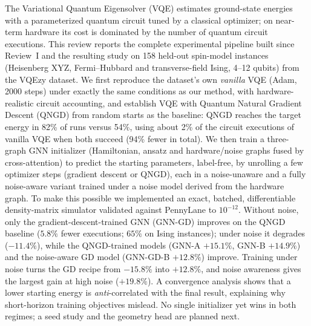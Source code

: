\documentclass{ssnreview}
\begin{document}
\makereviewtitle
\reviewfrontmatter

\begin{reviewabstract}
The Variational Quantum Eigensolver (VQE) estimates ground-state energies with a
parameterized quantum circuit tuned by a classical optimizer; on near-term hardware its cost
is dominated by the number of quantum circuit executions. This review reports the complete
experimental pipeline built since Review~I and the resulting study on 158 held-out spin-model
instances (Heisenberg XYZ, Fermi--Hubbard and transverse-field Ising, 4--12 qubits) from the
VQEzy dataset. We first reproduce the dataset's own \emph{vanilla} VQE (Adam, 2000 steps) under
exactly the same conditions as our method, with hardware-realistic circuit accounting, and
establish VQE with Quantum Natural Gradient Descent (QNGD) from random starts as the baseline:
QNGD reaches the target energy in 82\% of runs versus 54\%, using about 2\% of the circuit
executions of vanilla VQE when both succeed (94\% fewer in total). We then train a three-graph
GNN initializer (Hamiltonian, ansatz and hardware/noise graphs fused by cross-attention) to
predict the starting parameters, label-free, by unrolling a few optimizer steps (gradient
descent or QNGD), each in a noise-unaware and a fully noise-aware variant trained under a noise
model derived from the hardware graph. To make this possible we implemented an exact, batched,
differentiable density-matrix simulator validated against PennyLane to $10^{-12}$. Without
noise, only the gradient-descent-trained GNN (GNN-GD) improves on the QNGD baseline ($5.8\%$
fewer executions; $65\%$ on Ising instances); under noise it degrades ($-11.4\%$), while the
QNGD-trained models (GNN-A $+15.1\%$, GNN-B $+14.9\%$) and the noise-aware GD model (GNN-GD-B
$+12.8\%$) improve. Training under noise turns the GD recipe from $-15.8\%$ into $+12.8\%$, and
noise awareness gives the largest gain at high noise ($+19.8\%$). A convergence analysis shows
that a lower starting energy is \emph{anti}-correlated with the final result, explaining why
short-horizon training objectives mislead. No single initializer yet wins in both regimes; a
seed study and the geometry head are planned next.

\end{reviewabstract}
\end{document}
